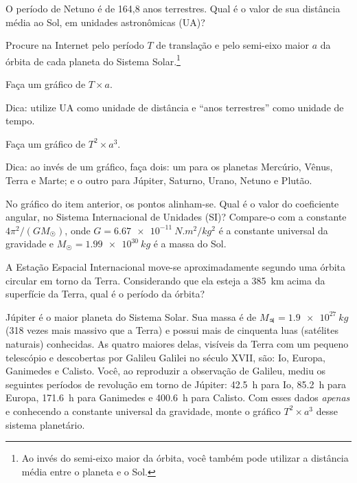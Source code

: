 \documentclass[a4paper]{article}
\begin{document}
\begin{exercicio}
 O período de Netuno é de 164,8 anos terrestres. Qual é o valor de sua distância média ao Sol, em unidades astronômicas (UA)?
\end{exercicio}

\begin{exercicio}
 Procure na Internet pelo período $T$ de translação e pelo semi-eixo maior $a$ da órbita de cada planeta do Sistema Solar.\footnote{Ao invés do semi-eixo maior da órbita, você também pode utilizar a distância média entre o planeta e o Sol.}
\begin{compactenum}[(a)]
\item Faça um gráfico de $T \times a$.

{\footnotesize Dica: utilize UA como unidade de distância e ``anos terrestres'' como unidade de tempo.}

\item Faça um gráfico de $T^2 \times a^3$.

{\footnotesize Dica: ao invés de um gráfico, faça dois: um para os planetas Mercúrio, Vênus, Terra e Marte;
e o outro para Júpiter, Saturno, Urano, Netuno e Plutão.}

\item No gráfico do item anterior, os pontos alinham-se. Qual é o valor do coeficiente angular, no Sistema Internacional de Unidades (SI)?
Compare-o com a constante $4\pi^2/(GM_{\astrosun})$, onde $G = \SI{6.67e-11}{N.m^2/kg^2}$ é a constante universal da gravidade e $M_{\astrosun} = \SI{1.99e30}{kg}$ é a massa do Sol.
\end{compactenum}
\end{exercicio}

\begin{exercicio}
 A Estação Espacial Internacional move-se aproximadamente segundo uma órbita circular em torno da Terra.
Considerando que ela esteja a \SI{385}{km} acima da superfície da Terra, qual é o período da órbita?
\end{exercicio}

\begin{exercicio*}
 Júpiter é o maior planeta do Sistema Solar. Sua massa é de $M_{\jupiter}=\SI{1.9e27}{kg}$ (318 vezes mais massivo que a Terra) e possui mais de cinquenta luas (satélites naturais) conhecidas. As quatro maiores delas, visíveis da Terra com um pequeno telescópio e descobertas por Galileu Galilei no século XVII, são: Io, Europa, Ganimedes e Calisto. Você, ao reproduzir a observação de Galileu, mediu os seguintes períodos de revolução em torno de Júpiter: \SI{42.5}{h} para Io, \SI{85.2}{h} para Europa, \SI{171.6}{h} para Ganimedes e \SI{400.6}{h} para Calisto.  
Com esses dados \emph{apenas} e conhecendo a constante universal da gravidade, monte o gráfico $T^2 \times a^3$ desse sistema planetário.
\end{exercicio*}
\end{document}

